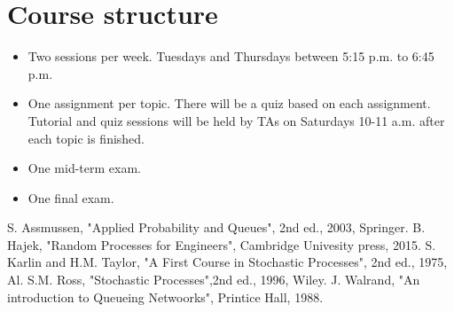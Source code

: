 \documentclass[all-lectures.tex]{subfiles}
\begin{document}
\onlyinsubfile{\maketitle}
\renewcommand\bibname{Reference Books}
%
\section*{Course structure}
\begin{itemize}
\item Two sessions per week. Tuesdays and Thursdays between 5:15 p.m. to 6:45 p.m.
\item One assignment per topic. There will be a quiz based on each assignment. Tutorial and quiz sessions will be held by TAs on Saturdays 10-11 a.m. after each topic is finished.
\item One mid-term exam.
\item One final exam.
\end{itemize}
\nopagebreak

\begin{thebibliography}{1}
\bibitem{} S. Assmussen, "Applied Probability and Queues", 2nd ed., 2003, Springer. 
\bibitem{} B. Hajek, "Random Processes for Engineers", Cambridge Univesity press, 2015.
\bibitem{} S. Karlin and H.M. Taylor, "A First Course in Stochastic Processes", 2nd ed., 1975, Al. 
\bibitem{} S.M. Ross, "Stochastic Processes",2nd ed., 1996, Wiley.
\bibitem{} J. Walrand, "An introduction to Queueing Netwoorks", Printice Hall, 1988.
\end{thebibliography}
\end{document}
